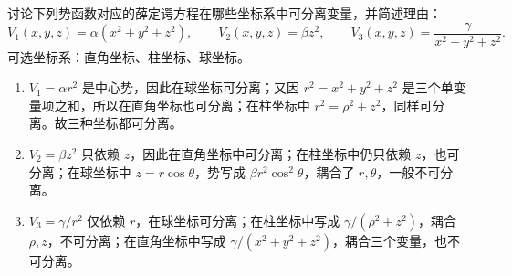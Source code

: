 \begin{question}
讨论下列势函数对应的薛定谔方程在哪些坐标系中可分离变量，并简述理由：
\[
V_1(x,y,z)=\alpha(x^2+y^2+z^2),\qquad V_2(x,y,z)=\beta z^2,
\qquad V_3(x,y,z)=\frac{\gamma}{x^2+y^2+z^2}.
\]
可选坐标系：直角坐标、柱坐标、球坐标。
\begin{solution}

\begin{enumerate}[label=（\arabic*）,leftmargin=2.8em,itemsep=0.2em]
\item $V_1=\alpha r^2$ 是中心势，因此在球坐标可分离；又因 $r^2=x^2+y^2+z^2$ 是三个单变量项之和，所以在直角坐标也可分离；在柱坐标中 $r^2=\rho^2+z^2$，同样可分离。故三种坐标都可分离。
\item $V_2=\beta z^2$ 只依赖 $z$，因此在直角坐标中可分离；在柱坐标中仍只依赖 $z$，也可分离；在球坐标中 $z=r\cos\theta$，势写成 $\beta r^2\cos^2\theta$，耦合了 $r,\theta$，一般不可分离。
\item $V_3=\gamma/r^2$ 仅依赖 $r$，在球坐标可分离；在柱坐标中写成 $\gamma/(\rho^2+z^2)$，耦合 $\rho,z$，不可分离；在直角坐标中写成 $\gamma/(x^2+y^2+z^2)$，耦合三个变量，也不可分离。
\end{enumerate}

\end{solution}
\end{question}

